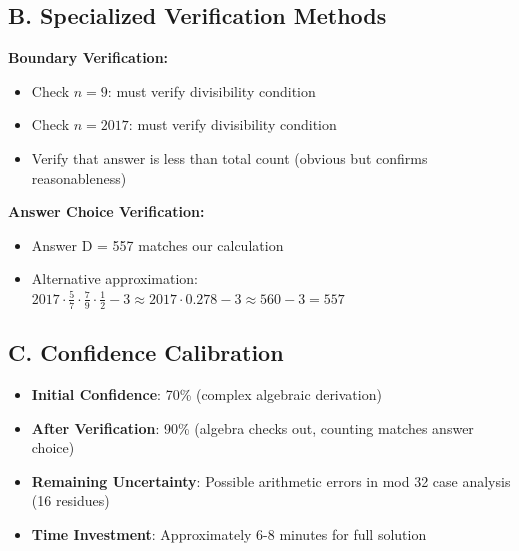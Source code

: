 \documentclass[]{article}
\begin{document}
\begin{verificationbox}
		\subsection*{B. Specialized Verification Methods}
		
		\textbf{Boundary Verification:}
		\begin{itemize}[nosep]
			\item Check $n = 9$: must verify divisibility condition
			\item Check $n = 2017$: must verify divisibility condition
			\item Verify that answer is less than total count (obvious but confirms reasonableness)
		\end{itemize}
		
		\textbf{Answer Choice Verification:}
		\begin{itemize}[nosep]
			\item Answer D = 557 matches our calculation
			\item Alternative approximation: $2017 \cdot \frac{5}{7} \cdot \frac{7}{9} \cdot \frac{1}{2} - 3 \approx 2017 \cdot 0.278 - 3 \approx 560 - 3 = 557$ \checkmark
		\end{itemize}
		
		\subsection*{C. Confidence Calibration}
		\begin{itemize}[leftmargin=*]
			\item \textbf{Initial Confidence}: 70\% (complex algebraic derivation)
			\item \textbf{After Verification}: 90\% (algebra checks out, counting matches answer choice)
			\item \textbf{Remaining Uncertainty}: Possible arithmetic errors in mod 32 case analysis (16 residues)
			\item \textbf{Time Investment}: Approximately 6-8 minutes for full solution
		\end{itemize}
	\end{verificationbox}
	
\end{document}
